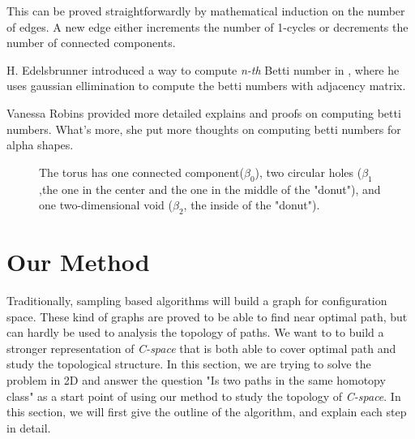 \documentclass[11pt]{article}
\begin{document}
\indent This can be proved straightforwardly by mathematical induction on the number of edges. A new edge either increments the number of 1-cycles or decrements the number of connected components. \cite{betti wiki}

\indent H. Edelsbrunner introduced a way to compute \emph{n-th} Betti number in \cite{Edel Book}, where he uses gaussian ellimination to compute the betti numbers with adjacency matrix.

\indent Vanessa Robins \cite{alpha betti} provided more detailed explains and proofs on computing betti numbers. What's more, she put more thoughts on computing betti numbers for alpha shapes.

\begin{figure}
	\caption{\label{fig:Torus} The torus has one connected component($\beta_0$), two circular holes ($\beta_1$,the one in the center and the one in the middle of the "donut"), and one two-dimensional void ($\beta_2$, the inside of the "donut").\cite{betti wiki}}
\end{figure}


%

\section{Our Method}\label{method}

\indent \indent Traditionally, sampling based algorithms will build a graph for configuration space. These kind of graphs are proved to be able to find near optimal path, but can hardly be used to analysis the topology of paths. We want to to build a stronger representation of \emph{C-space} that is both able to cover optimal path and study the topological structure. In this section, we are trying to solve the problem in 2D and answer the question "Is two paths in the same homotopy class" as a start point of using our method to study the topology of \emph{C-space}. In this section, we will first give the outline of the algorithm, and explain each step in detail. 
\end{document}
